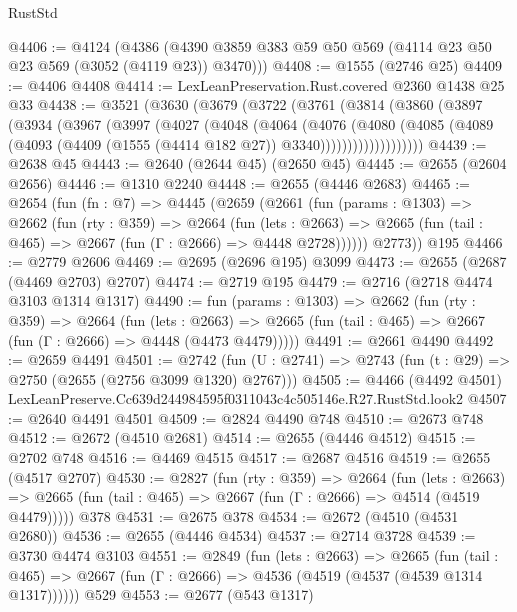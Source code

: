 \begin{lexlean}{RustStd}
\begin{coremodule}
@4406 := @4124
    (@4386 (@4390 @3859 @383 @59 @50 @569 (@4114 @23 @50 @23 @569 (@3052 (@4119 @23)) @3470)))
@4408 := @1555 (@2746 @25)
@4409 := @4406 @4408
@4414 := LexLeanPreservation.Rust.covered @2360 @1438 @25 @33
@4438 := @3521
    (@3630
      (@3679
        (@3722
          (@3761
            (@3814
              (@3860
                (@3897
                  (@3934
                    (@3967
                      (@3997
                        (@4027
                          (@4048
                            (@4064
                              (@4076
                                (@4080
                                  (@4085
                                    (@4089
                                      (@4093
                                        (@4409 (@1555 (@4414 @182 @27)) @3340)))))))))))))))))))
@4439 := @2638 @45
@4443 := @2640 (@2644 @45) (@2650 @45)
@4445 := @2655 (@2604 @2656)
@4446 := @1310 @2240
@4448 := @2655 (@4446 @2683)
@4465 := @2654
    (fun (fn : @7) =>
    @4445
      (@2659
        (@2661
          (fun (params : @1303) =>
          @2662
            (fun (rty : @359) =>
            @2664
              (fun (lets : @2663) =>
              @2665 (fun (tail : @465) => @2667 (fun (Γ : @2666) => @4448 @2728))))))
        @2773))
    @195
@4466 := @2779 @2606
@4469 := @2695 (@2696 @195) @3099
@4473 := @2655 (@2687 (@4469 @2703) @2707)
@4474 := @2719 @195
@4479 := @2716 (@2718 @4474 @3103 @1314 @1317)
@4490 := fun (params : @1303) =>
  @2662
    (fun (rty : @359) =>
    @2664
      (fun (lets : @2663) =>
      @2665 (fun (tail : @465) => @2667 (fun (Γ : @2666) => @4448 (@4473 @4479)))))
@4491 := @2661 @4490
@4492 := @2659 @4491
@4501 := @2742 (fun (U : @2741) => @2743 (fun (t : @29) => @2750 (@2655 (@2756 @3099 @1320) @2767)))
@4505 := @4466 (@4492 @4501) LexLeanPreserve.Cc639d244984595f0311043c4c505146e.R27.RustStd.look2
@4507 := @2640 @4491 @4501
@4509 := @2824 @4490 @748
@4510 := @2673 @748
@4512 := @2672 (@4510 @2681)
@4514 := @2655 (@4446 @4512)
@4515 := @2702 @748
@4516 := @4469 @4515
@4517 := @2687 @4516
@4519 := @2655 (@4517 @2707)
@4530 := @2827
    (fun (rty : @359) =>
    @2664
      (fun (lets : @2663) =>
      @2665 (fun (tail : @465) => @2667 (fun (Γ : @2666) => @4514 (@4519 @4479)))))
    @378
@4531 := @2675 @378
@4534 := @2672 (@4510 (@4531 @2680))
@4536 := @2655 (@4446 @4534)
@4537 := @2714 @3728
@4539 := @3730 @4474 @3103
@4551 := @2849
    (fun (lets : @2663) =>
    @2665
      (fun (tail : @465) => @2667 (fun (Γ : @2666) => @4536 (@4519 (@4537 (@4539 @1314 @1317))))))
    @529
@4553 := @2677 (@543 @1317)

\end{coremodule}
\end{lexlean}
